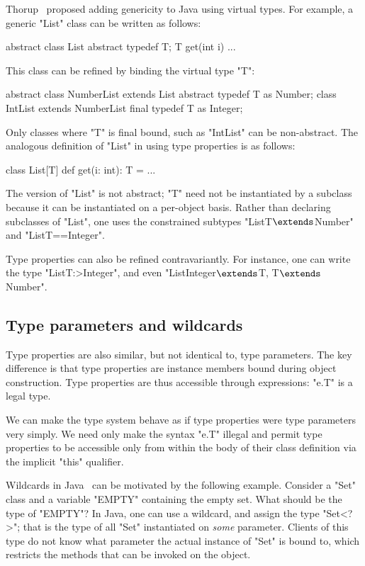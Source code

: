 Thorup~\cite{thorup97}
proposed adding genericity to Java using virtual types.  For example,
a generic \xcd"List" class can be written as follows:
{\footnotesize
\begin{xten}
abstract class List {
  abstract typedef T;
  T get(int i) { ... }
}
\end{xten}}
\noindent
This class can be refined by binding the virtual type \xcd"T":
{\footnotesize
\begin{xten}
abstract class NumberList extends List {
  abstract typedef T as Number;
}
class IntList extends NumberList {
  final typedef T as Integer;
}
\end{xten}}
\noindent
Only classes where \xcd"T" is final bound, such as \xcd"IntList"
can be non-abstract.
%
The analogous definition of 
\xcd"List" in \Xten{} using type properties is as follows:
{\footnotesize
\begin{xten}
class List[T] {
  def get(i: int): T = { ... }
}
\end{xten}}

The \Xten{} version of \xcd"List" is not abstract;
\xcd"T" need not be instantiated by a subclass because it can be
instantiated on a per-object basis.
Rather than declaring subclasses of \xcd"List",
one uses the constrained subtypes
\xcdmath"List{T$\extends$Number}" and \xcd"List{T==Integer}".

Type properties can also be refined contravariantly.
For instance, one can write the type \xcd"List{T:>Integer}",
and even \xcdmath"List{Integer$\extends$T, T$\extends$Number}".

\subsection{Type parameters and wildcards}
\label{sec:parameters-vs-fields}

Type properties are also similar, but not identical to, type
parameters.  The key difference is that type properties are
instance members bound during object construction.  Type
properties are thus accessible through expressions: \xcd"e.T" is
a legal type.

We can make the type system behave as if type properties were
type parameters very simply.  We need only make the syntax \xcd"e.T"
illegal and permit type properties to be accessible only
from within the body of their class definition via the implicit \xcd"this"
qualifier.

Wildcards in Java~\cite{Java3,adding-wildcards} can be motivated
by the following example.
Consider a \xcd"Set" class and a variable \xcd"EMPTY" containing
the empty set.  What should be the type of \xcd"EMPTY"?
In Java, one can use a wildcard, and 
assign the type \xcd"Set<?>"; that is the type of all \xcd"Set"
instantiated on {\em some} parameter.  Clients of this
type do not know what parameter the actual instance of \xcd"Set"
is bound to, which restricts the methods that can be invoked on
the object.

